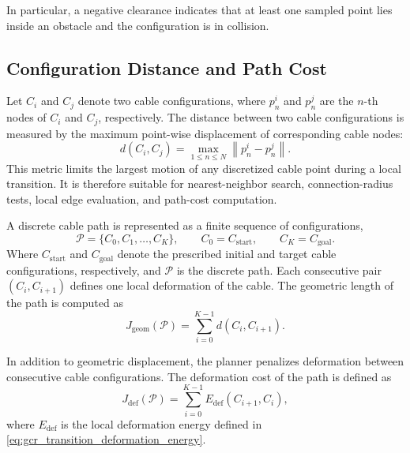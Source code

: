 \documentclass{pas}
\begin{document}
In particular, a negative clearance indicates that at least one sampled point lies inside an obstacle and the configuration is in collision.

\subsection{Configuration Distance and Path Cost}
\label{subsec:distance_path_cost}

Let \(C_i\) and \(C_j\) denote two cable configurations, where
\(p_n^i\) and \(p_n^j\) are the \(n\)-th nodes of \(C_i\) and \(C_j\),
respectively.
The distance between two cable configurations is measured by the maximum
point-wise displacement of corresponding cable nodes:
\begin{equation}
d(C_i,C_j)
=
\max_{1\leq n\leq N}
\left\|
p_n^{i}-p_n^{j}
\right\|.
\label{eq:configuration_distance_metric}
\end{equation}
This metric limits the largest motion of any discretized cable point during a
local transition. It is therefore suitable for nearest-neighbor search,
connection-radius tests, local edge evaluation, and path-cost computation.

A discrete cable path is represented as a finite sequence of configurations,
\begin{equation}
\mathcal{P}
=
\{C_0,C_1,\ldots,C_K\},
\qquad
C_0=C_{\mathrm{start}},
\qquad
C_K=C_{\mathrm{goal}} .
\label{eq:discrete_cable_path}
\end{equation}
Where  \(C_{\mathrm{start}}\) and \(C_{\mathrm{goal}}\) denote the prescribed
initial and target cable configurations, respectively, and \(\mathcal{P}\) is the discrete path.
Each consecutive pair \((C_i,C_{i+1})\) defines one local deformation of the
cable. The geometric length of the path is computed as
\begin{equation}
J_{\mathrm{geom}}(\mathcal{P})
=
\sum_{i=0}^{K-1}
d(C_i,C_{i+1}).
\label{eq:path_geometric_cost}
\end{equation}

In addition to geometric displacement, the planner penalizes deformation between
consecutive cable configurations. The deformation cost of the path is defined as
\begin{equation}
J_{\mathrm{def}}(\mathcal{P})
=
\sum_{i=0}^{K-1}
E_{\mathrm{def}}(C_{i+1},C_i),
\label{eq:path_deformation_cost}
\end{equation}
where \(E_{\mathrm{def}}\) is the local deformation energy defined in
\eqref{eq:gcr_transition_deformation_energy}.
\end{document}
